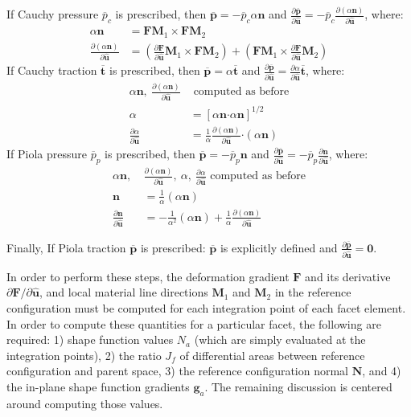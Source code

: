 If Cauchy pressure $\overline{p}_c$ is prescribed, then $\bm {\overline{p}} = {-\overline{p}_c}\alpha{\bm n}$ and $\frac{\partial \bm {\overline{p}}}{\partial \hat {\bm{u}}} = {-\overline{p}_c}\frac{\partial (\alpha {\bm n})}{\partial {\hat {\bm{u}}}}$, where:
\begin{align}
\alpha{\bm n} &= {\bm F}{\bm M}_1 \times {\bm F}{\bm M}_2 \\
\frac{\partial (\alpha{\bm n})}{\partial {\hat {\bm{u}}}} &= (\frac{\partial {\bm F}}{\partial {\hat {\bm{u}}}}{\bm M}_1 \times {\bm F}{\bm M}_2) + ({\bm F}{\bm M}_1 \times \frac{\partial {\bm F}}{\partial {\hat {\bm{u}}}}{\bm M}_2)
\end{align}
If Cauchy traction $\overline{\bm{t}}$ is prescribed, then $\bm {\overline{p}} = \alpha{\overline{\bm{t}}}$ and $\frac{\partial \bm {\overline{p}}}{\partial {\hat {\bm{u}}}} = \frac{\partial \alpha}{\partial {\hat {\bm{u}}}}{\overline{\bm{t}}}$, where:
\begin{align}
{\alpha \bm n}, \ \frac{\partial (\alpha {\bm n})}{\partial {\hat {\bm{u}}}} &\text{ computed as before} \nonumber \\
\alpha &= [\alpha {\bm n} \bm{\cdot} \alpha {\bm n}]^{1/2} \\
 \frac{\partial{\alpha}}{\partial {\hat {\bm{u}}}} &= \frac{1}{\alpha}\frac{\partial({\alpha {\bm n}})}{\partial {\hat {\bm{u}}}} \bm{\cdot} ({\alpha \bm n})
\end{align}
If Piola pressure $\overline{p}_p$ is prescribed, then $\bm{\overline{p}} = {-\overline{p}_p}{\bm n}$ and $\frac{\partial \bm {\overline{p}}}{\partial {\hat {\bm{u}}}} = {-\overline{p}_p}\frac{\partial {\bm n}}{\partial {\hat {\bm{u}}}}$, where:
\begin{align}
{\alpha \bm n}, \ &\frac{\partial (\alpha {\bm n})}{\partial {\hat {\bm{u}}}}, \ \alpha, \ \frac{\partial \alpha}{\partial {\hat {\bm{u}}}} \text{ computed as before} \nonumber \\
{\bm n} &= \frac{1}{\alpha}(\alpha {\bm n}) \\
\frac{\partial {\bm n}}{\partial {\hat {\bm{u}}}} &= -\frac{1}{\alpha^2}(\alpha {\bm n}) + \frac{1}{\alpha}\frac{\partial (\alpha{\bm n})}{\partial {\hat {\bm{u}}}}
\end{align}

Finally, If Piola traction $\bm {\overline{p}}$ is prescribed: $\bm {\overline{p}}$ is explicitly defined and $\frac{\partial \bm {\overline{p}}}{\partial {\hat {\bm{u}}}} = {\bm 0}$.

In order to perform these steps, the deformation gradient $\bm{F}$ and its derivative ${\partial \bm{F}}/{\partial \hat{\bm{u}}}$, and local material line directions $\bm{M}_1$ and $\bm{M}_2$ in the reference configuration must be computed for each integration point of each facet element. In order to compute these quantities for a particular facet, the following are required: 1) shape function values $N_a$ (which are simply evaluated at the integration points), 2) the ratio $J_f$ of differential areas between reference configuration and parent space, 3) the reference configuration normal ${\bm {N}}$, and 4) the in-plane shape function gradients ${\bm {g}}_a$. The remaining discussion is centered around computing those values.

